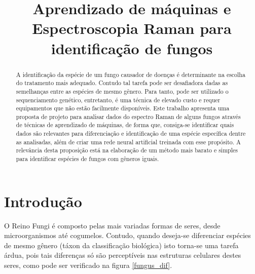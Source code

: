 \documentclass[conference,peerreview]{IEEEtran}
\begin{document}
\title{Aprendizado de máquinas e Espectroscopia Raman para identificação de fungos}


\author{
} %


\ifCLASSOPTIONpeerreview
	\setcounter{page}{1}
	\IEEEpeerreviewmaketitle
\else
	\maketitle
\fi


\begin{abstract}
A identificação da espécie de um fungo causador de doenças é determinante na escolha do tratamento mais adequado. Contudo tal tarefa pode ser desafiadora dadas as semelhanças entre as espécies de mesmo gênero. Para tanto, pode ser utilizado o sequenciamento genético, entretanto, é uma técnica de elevado custo e requer equipamentos que não estão facilmente disponíveis. Este trabalho apresenta uma proposta de projeto para analisar dados do espectro Raman de alguns fungos através de técnicas de aprendizado de máquinas, de forma que, consiga-se identificar quais dados são relevantes para diferenciação e identificação de uma espécie específica dentre as analisadas, além de criar uma rede neural artificial treinada com esse propósito. A relevância desta proposição está na elaboração de um método mais barato e simples para identificar espécies de fungos com gêneros iguais. 
\end{abstract}

\section{Introdução}
O Reino Fungi é composto pelas mais variadas formas de seres, desde microorganismos até cogumelos. Contudo, quando deseja-se diferenciar espécies de mesmo gênero (táxon da classificação biológica) isto torna-se uma tarefa árdua, pois tais diferenças só são perceptíveis nas estruturas celulares destes seres, como pode ser verificado na figura \ref{fungus_dif}.
\end{document}

